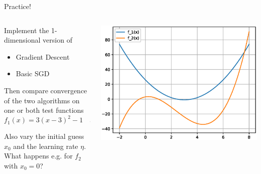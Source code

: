 \begin{frame}{Practice!}
    \begin{columns}[onlytextwidth]
        \begin{column}{0.5\textwidth}
            Implement the 1-dimensional version of
            \begin{itemize}
                \item Gradient Descent
                \item Basic SGD
            \end{itemize}
            Then compare convergence of the two algorithms on one or both test functions
            $$f_1(x) = 3(x - 3)^2 - 1 \quad \text{and} \quad f_2(x) = (x - 1)^3 - 4x^2 + 4$$

            Also vary the initial guess $x_0$ and the learning rate $\eta$. What happens 
            e.g. for $f_2$ with $x_0 = 0$?
        \end{column}
        \begin{column}{0.5\textwidth}
            \centering
            \includegraphics[width=\textwidth]{fig/ex_polys.eps}
        \end{column}
    \end{columns}
\end{frame}

